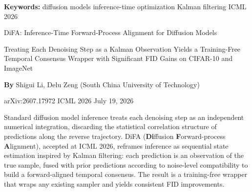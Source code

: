 \documentclass[10pt,twocolumn]{article}
\begin{document}
\setlength{\parindent}{0pt}
\setlength{\parskip}{4pt}

{\small\color{keywordgray}\textbf{Keywords:}
  diffusion models \textbullet{}
  inference-time optimization \textbullet{}
  Kalman filtering \textbullet{}
  ICML 2026}\par\vspace{4pt}

{\LARGE\bfseries\raggedright
  DiFA: Inference-Time Forward-Process
  Alignment for Diffusion Models}\par\vspace{4pt}

{\large\itshape\raggedright
  Treating Each Denoising Step as a Kalman Observation Yields a
  Training-Free Temporal Consensus Wrapper with Significant FID
  Gains on CIFAR-10 and ImageNet}\par\vspace{6pt}

{\small\textbf{By} Shigui Li, Delu Zeng
  (South China University of Technology)}\par\vspace{2pt}

{\small\color{keywordgray}arXiv:2607.17972 \textbullet{}
  ICML 2026 \textbullet{} July 19, 2026}
\par\vspace{2pt}\noindent{\color{rulered}\rule{\columnwidth}{0.6pt}}\vspace{6pt}

Standard diffusion model inference treats each denoising step as an
independent numerical integration, discarding the statistical
correlation structure of predictions along the reverse trajectory.
DiFA (\textbf{Di}ffusion \textbf{F}orward-process \textbf{A}lignment),
accepted at ICML 2026, reframes inference as sequential state estimation
inspired by Kalman filtering: each prediction is an observation of the
true sample, fused with prior predictions according to noise-level
compatibility to build a forward-aligned temporal consensus. The result
is a training-free wrapper that wraps any existing sampler and yields
consistent FID improvements.
\end{document}
